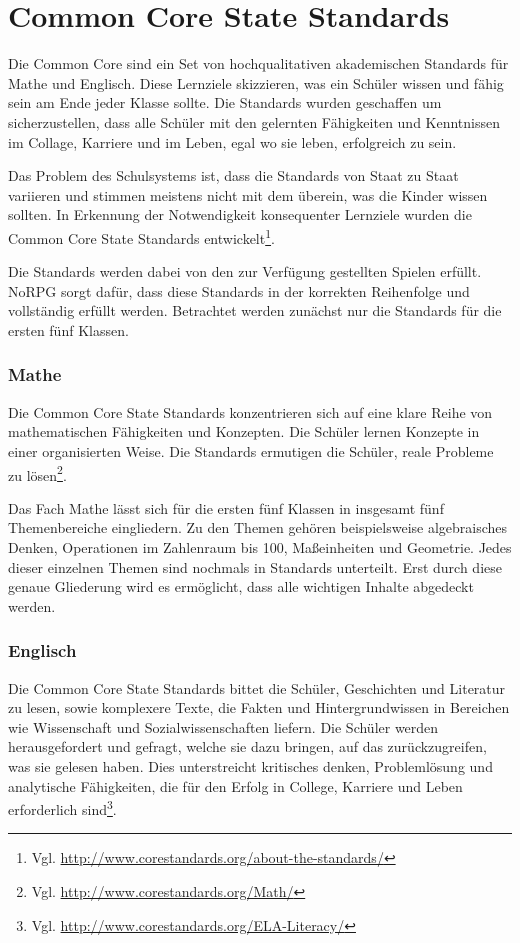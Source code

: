 \section{Common Core State Standards}
Die Common Core sind ein Set von hochqualitativen akademischen Standards für Mathe und Englisch. Diese Lernziele skizzieren, was ein Schüler wissen und fähig sein am Ende jeder Klasse sollte. Die Standards wurden geschaffen um sicherzustellen, dass alle Schüler mit den gelernten Fähigkeiten und Kenntnissen im Collage, Karriere und im Leben, egal wo sie leben, erfolgreich zu sein.

Das Problem des Schulsystems ist, dass die Standards von Staat zu Staat variieren und stimmen meistens nicht mit dem überein, was die Kinder wissen sollten. In Erkennung der Notwendigkeit konsequenter Lernziele wurden die Common Core State Standards entwickelt\footnote{Vgl. \url{http://www.corestandards.org/about-the-standards/}}.

Die Standards werden dabei von den zur Verfügung gestellten Spielen erfüllt. NoRPG sorgt dafür, dass diese Standards in der korrekten Reihenfolge und vollständig erfüllt werden. Betrachtet werden zunächst nur die Standards für die ersten fünf Klassen.

\subsubsection{Mathe}
Die Common Core State Standards konzentrieren sich auf eine klare Reihe von mathematischen Fähigkeiten und Konzepten. Die Schüler lernen Konzepte in einer organisierten Weise. Die Standards ermutigen die Schüler, reale Probleme zu lösen\footnote{Vgl. \url{http://www.corestandards.org/Math/}}.

Das Fach Mathe lässt sich für die ersten fünf Klassen in insgesamt fünf Themenbereiche eingliedern. Zu den Themen gehören beispielsweise algebraisches Denken, Operationen im Zahlenraum bis 100, Maßeinheiten und Geometrie. Jedes dieser einzelnen Themen sind nochmals in Standards unterteilt. Erst durch diese genaue Gliederung wird es ermöglicht, dass alle wichtigen Inhalte abgedeckt werden.

\subsubsection{Englisch}
Die Common Core State Standards bittet die Schüler, Geschichten und Literatur zu lesen, sowie komplexere Texte, die Fakten und Hintergrundwissen in Bereichen wie Wissenschaft und Sozialwissenschaften liefern. Die Schüler werden herausgefordert und gefragt, welche sie dazu bringen, auf das zurückzugreifen, was sie gelesen haben. Dies unterstreicht kritisches denken, Problemlösung und analytische Fähigkeiten, die für den Erfolg in College, Karriere und Leben erforderlich sind\footnote{Vgl. \url{http://www.corestandards.org/ELA-Literacy/}}.

